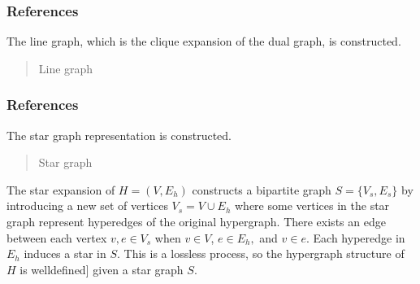 \documentclass[letterpaper,10pt,english]{sphinxmanual}
\begin{document}
\begin{fulllineitems}
\begin{fulllineitems}
\subsubsection*{References}

\end{fulllineitems}


\begin{fulllineitems}
\label{\detokenize{HAT:HAT.Hypergraph.Hypergraph.lineGraph}}
\pysigstartsignatures
{}
\pysigstopsignatures
\sphinxAtStartPar
The line graph, which is the clique expansion of the dual graph, is constructed.
\begin{quote}\begin{description}
\sphinxAtStartPar
Line graph

\sphinxAtStartPar
{}

\end{description}\end{quote}
\subsubsection*{References}

\end{fulllineitems}


\begin{fulllineitems}
\label{\detokenize{HAT:HAT.Hypergraph.Hypergraph.starGraph}}
\pysigstartsignatures
{}
\pysigstopsignatures
\sphinxAtStartPar
The star graph representation is constructed.
\begin{quote}\begin{description}
\sphinxAtStartPar
Star graph

\sphinxAtStartPar
{}

\end{description}\end{quote}

\sphinxAtStartPar
The star expansion of \({H}=({V},{E}_h)\) constructs a bipartite graph \({S}=\{{V}_s,{E}_s\}\)
by introducing a new set of vertices \({V}_s={V}\cup {E}_h\) where some vertices in the star graph
represent hyperedges of the original hypergraph. There exists an edge between each vertex \(v,e\in {V}_s\)
when \(v\in {V}\), \(e\in {E}_h,\) and \(v\in e\). Each hyperedge in \({E}_h\) induces
a star in \(S\). This is a lossless process, so the hypergraph structure of \(H\) is well\sphinxhyphen{}defined{]}
given a star graph \(S\).

\end{fulllineitems}
\end{fulllineitems}
\end{document}
